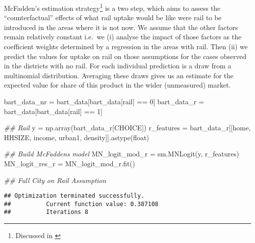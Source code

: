 \documentclass[]{tufte-book}
\newenvironment{Shaded}{}{}
\newcommand{\BuiltInTok}[1]{#1}
\newcommand{\CommentTok}[1]{\textcolor[rgb]{0.38,0.63,0.69}{\textit{#1}}}
\newcommand{\DecValTok}[1]{\textcolor[rgb]{0.25,0.63,0.44}{#1}}
\newcommand{\NormalTok}[1]{#1}
\newcommand{\OperatorTok}[1]{\textcolor[rgb]{0.40,0.40,0.40}{#1}}
\newcommand{\StringTok}[1]{\textcolor[rgb]{0.25,0.44,0.63}{#1}}
\theoremstyle{definition}
\theoremstyle{definition}
\theoremstyle{definition}
\theoremstyle{remark}
\begin{document}
McFadden's estimation strategy\footnote{Discussed in \citet{MicroeconR}} is a two step, which aims to assess the ``counterfactual'' effects of what rail uptake would be like were rail to be introduced in the areas where it is not now. We assume that the other factors remain relatively constant i.e.~we (i) analyse the impact of those factors as the coefficient weights determined by a regression in the areas with rail. Then (ii) we predict the values for uptake on rail on those assumptions for the cases observed in the districts with no rail. For each individual prediction is a draw from a multinomial distribution. Averaging these draws gives us an estimate for the expected value for share of this product in the wider (unmeasured) market.

\begin{Shaded}
\begin{Highlighting}[]
\NormalTok{bart\_data\_nr }\OperatorTok{=}\NormalTok{ bart\_data[bart\_data[}\StringTok{\textquotesingle{}rail\textquotesingle{}}\NormalTok{] }\OperatorTok{==} \DecValTok{0}\NormalTok{]}
\NormalTok{bart\_data\_r }\OperatorTok{=}\NormalTok{ bart\_data[bart\_data[}\StringTok{\textquotesingle{}rail\textquotesingle{}}\NormalTok{] }\OperatorTok{==} \DecValTok{1}\NormalTok{]}

\CommentTok{\#\# Rail}
\NormalTok{y }\OperatorTok{=}\NormalTok{ np.array(bart\_data\_r[}\StringTok{\textquotesingle{}CHOICE\textquotesingle{}}\NormalTok{])}
\NormalTok{r\_features }\OperatorTok{=}\NormalTok{ bart\_data\_r[[}\StringTok{\textquotesingle{}home\textquotesingle{}}\NormalTok{, }\StringTok{\textquotesingle{}HHSIZE\textquotesingle{}}\NormalTok{, }\StringTok{\textquotesingle{}income\textquotesingle{}}\NormalTok{, }\StringTok{\textquotesingle{}urban1\textquotesingle{}}\NormalTok{, }\StringTok{\textquotesingle{}density\textquotesingle{}}\NormalTok{]].astype(}\BuiltInTok{float}\NormalTok{)}

\CommentTok{\#\# Build McFadden\textquotesingle{}s model}
\NormalTok{MN\_logit\_mod\_r }\OperatorTok{=}\NormalTok{ sm.MNLogit(y, r\_features)}
\NormalTok{MN\_logit\_res\_r }\OperatorTok{=}\NormalTok{ MN\_logit\_mod\_r.fit()}

\CommentTok{\#\# Full City on Rail Assumption}
\end{Highlighting}
\end{Shaded}

\begin{verbatim}
## Optimization terminated successfully.
##          Current function value: 0.387108
##          Iterations 8
\end{verbatim}
\end{document}
